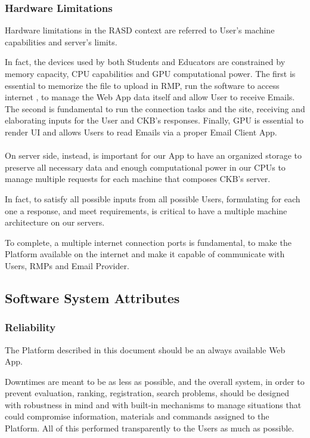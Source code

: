 \subsubsection{Hardware Limitations}
Hardware limitations in the RASD context are referred to User's machine capabilities and server's limits. 

In fact, the devices used by both Students and Educators are constrained by memory capacity, CPU capabilities and GPU computational power. The first is essential to memorize the file to upload in RMP, run the software to access internet
, to manage the Web App data itself and allow User to receive Emails. The second is fundamental to run the connection tasks and the site, receiving and elaborating inputs for the User and CKB's responses. Finally, GPU is essential to render UI and allows Users to read Emails via a proper Email Client App.\\
\\
 On server side, instead, is important for our App to have an organized storage to preserve all necessary data and enough computational power in our CPUs to manage multiple requests for each machine that composes CKB's server. 
 
In fact, to satisfy all possible inputs from all possible Users, formulating for each one a response, and meet requirements, is critical to have a multiple machine architecture on our servers. 

To complete, a multiple internet connection ports is fundamental, to make the Platform available on the internet and make it capable of communicate with Users, RMPs and Email Provider.

\subsection{Software System Attributes}

\subsubsection{Reliability}
The Platform described in this document should be an always available Web App. 

Downtimes are meant to be as less as possible, and the overall system, in order to prevent evaluation, ranking, registration, search problems, should be designed with robustness in mind and with built-in mechanisms to manage situations 
that could compromise information, materials and commands assigned to the Platform. All of this performed transparently to the Users as much as possible.

